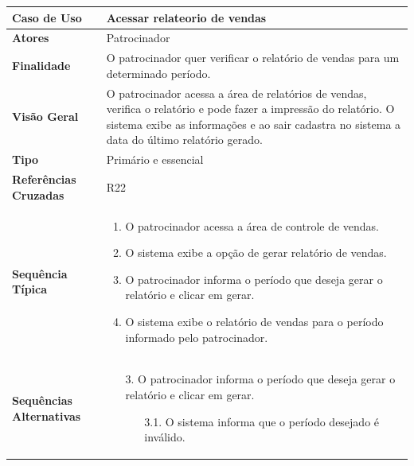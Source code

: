 \documentclass[a4paper,11pt]{article}
\begin{document}
\begin{table}[H]
		\begin{tabularx}{\textwidth}{|l|X|}
		\hline
			\textbf{Caso de Uso} &  Acessar relateorio de vendas \\ \hline
			\textbf{Atores} &   Patrocinador \\ \hline
			\textbf{Finalidade} & O patrocinador quer verificar o relatório de vendas para um determinado período.  \\ \hline
			\textbf{Visão Geral} &  O patrocinador acessa a área de relatórios de vendas, verifica o relatório e pode fazer a impressão do relatório. O sistema exibe as informações e ao sair cadastra no sistema a data do último relatório gerado.  \\ \hline
			\textbf{Tipo} & Primário e essencial \\ \hline
			\textbf{Referências Cruzadas} & R22 \\ \hline
			\textbf{Sequência Típica} & 
			\begin{enumerate}
			\item O patrocinador acessa a área de controle de vendas.
			\item O sistema exibe a opção de gerar relatório de vendas.
			\item O patrocinador informa o período que deseja gerar o relatório e clicar em gerar.
			\item O sistema exibe o relatório de vendas para o período informado pelo patrocinador.
			\end{enumerate} \\ \hline
			
			\textbf{Sequências Alternativas} & 
			\begin{itemize}
				\item[3.] O patrocinador informa o período que deseja gerar o relatório e clicar em gerar.
				\begin{itemize}
					\item[3.1.] O sistema informa que o período desejado é inválido.
				\end{itemize}
			\end{itemize} \\ \hline
		\end{tabularx}
\end{table}
\end{document}
